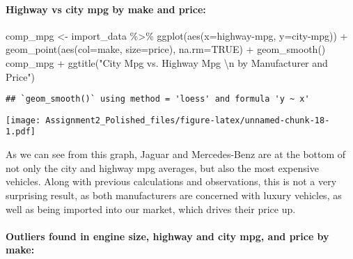 \documentclass[
]{article}
\newenvironment{Shaded}{\begin{snugshade}}{\end{snugshade}}
\newcommand{\AttributeTok}[1]{\textcolor[rgb]{0.77,0.63,0.00}{#1}}
\newcommand{\ConstantTok}[1]{\textcolor[rgb]{0.00,0.00,0.00}{#1}}
\newcommand{\FunctionTok}[1]{\textcolor[rgb]{0.00,0.00,0.00}{#1}}
\newcommand{\NormalTok}[1]{#1}
\newcommand{\OtherTok}[1]{\textcolor[rgb]{0.56,0.35,0.01}{#1}}
\newcommand{\SpecialCharTok}[1]{\textcolor[rgb]{0.00,0.00,0.00}{#1}}
\newcommand{\StringTok}[1]{\textcolor[rgb]{0.31,0.60,0.02}{#1}}
\begin{document}
\hypertarget{highway-vs-city-mpg-by-make-and-price}{%
\paragraph{Highway vs city mpg by make and
price:}\label{highway-vs-city-mpg-by-make-and-price}}

\begin{Shaded}
\begin{Highlighting}[]
\NormalTok{comp\_mpg }\OtherTok{\textless{}{-}}\NormalTok{ import\_data }\SpecialCharTok{\%\textgreater{}\%} \FunctionTok{ggplot}\NormalTok{(}\FunctionTok{aes}\NormalTok{(}\AttributeTok{x=}\StringTok{\textasciigrave{}}\AttributeTok{highway{-}mpg}\StringTok{\textasciigrave{}}\NormalTok{, }\AttributeTok{y=}\StringTok{\textasciigrave{}}\AttributeTok{city{-}mpg}\StringTok{\textasciigrave{}}\NormalTok{)) }\SpecialCharTok{+} \FunctionTok{geom\_point}\NormalTok{(}\FunctionTok{aes}\NormalTok{(}\AttributeTok{col=}\NormalTok{make, }\AttributeTok{size=}\NormalTok{price), }\AttributeTok{na.rm=}\ConstantTok{TRUE}\NormalTok{) }\SpecialCharTok{+} \FunctionTok{geom\_smooth}\NormalTok{()}
\NormalTok{comp\_mpg }\SpecialCharTok{+} \FunctionTok{ggtitle}\NormalTok{(}\StringTok{"City Mpg vs. Highway Mpg }\SpecialCharTok{\textbackslash{}n}\StringTok{ by Manufacturer and Price"}\NormalTok{)}
\end{Highlighting}
\end{Shaded}

\begin{verbatim}
## `geom_smooth()` using method = 'loess' and formula 'y ~ x'
\end{verbatim}

\texttt{[image: Assignment2\_Polished\_files/figure-latex/unnamed-chunk-18-1.pdf]}

As we can see from this graph, Jaguar and Mercedes-Benz are at the
bottom of not only the city and highway mpg averages, but also the most
expensive vehicles. Along with previous calculations and observations,
this is not a very surprising result, as both manufacturers are
concerned with luxury vehicles, as well as being imported into our
market, which drives their price up.

\hypertarget{outliers-found-in-engine-size-highway-and-city-mpg-and-price-by-make}{%
\paragraph{Outliers found in engine size, highway and city mpg, and
price by
make:}\label{outliers-found-in-engine-size-highway-and-city-mpg-and-price-by-make}}
\end{document}
